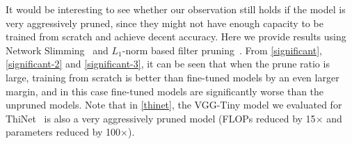 It would be interesting to see whether our observation still holds if the model is very aggressively pruned, since they might not have enough capacity to be trained from scratch and achieve decent accuracy. Here we provide results using Network Slimming~\cite{liu2017learning} and $L_1$-norm based filter pruning~\cite{li2016pruning}.  From \autoref{significant}, \autoref{significant-2} and \autoref{significant-3}, it can be seen that when the prune ratio is large, training from scratch is better than fine-tuned models by an even larger margin, and in this case fine-tuned models are significantly worse than the unpruned models. Note that in \autoref{thinet}, the VGG-Tiny model we evaluated for ThiNet~\cite{luo2017thinet} is also a very aggressively pruned model (FLOPs reduced by 15$\times$ and parameters reduced by 100$\times$).
\setlength{\tabcolsep}{4pt}
\renewcommand{\arraystretch}{1.15}
\begin{table}[!htbp]
\centering
\small
\caption{Results (accuracy) for Network Slimming~\cite{liu2017learning} when the models are aggressively pruned. ``Prune ratio'' stands for total percentage of channels that are pruned in the whole network. Larger ratios are used than the original paper of~\cite{liu2017learning}. 
}
\label{significant}
\end{table}



